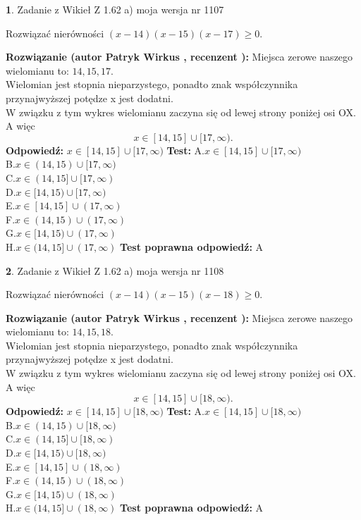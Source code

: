 \documentclass[12pt, a4paper]{article}
\theoremstyle{definition} %
\newtheorem{zad}{}
\newcommand{\zadStart}[1]{\begin{zad}#1\newline}
\newcommand{\zadStop}{\end{zad}}
\newcommand{\rozwStart}[2]{\noindent \textbf{Rozwiązanie (autor #1 , recenzent #2): }\newline}
\newcommand{\rozwStop}{\newline}
\newcommand{\odpStart}{\noindent \textbf{Odpowiedź:}\newline}
\newcommand{\odpStop}{\newline}
\newcommand{\testStart}{\noindent \textbf{Test:}\newline}
\newcommand{\testStop}{\newline}
\newcommand{\kluczStart}{\noindent \textbf{Test poprawna odpowiedź:}\newline}
\newcommand{\kluczStop}{\newline}
\begin{document}
\zadStart{Zadanie z Wikieł Z 1.62 a) moja wersja nr 1107}

Rozwiązać nierówności $(x-14)(x-15)(x-17)\ge0$.
\zadStop
\rozwStart{Patryk Wirkus}{}
Miejsca zerowe naszego wielomianu to: $14, 15, 17$.\\
Wielomian jest stopnia nieparzystego, ponadto znak współczynnika przy\linebreak najwyższej potędze x jest dodatni.\\ W związku z tym wykres wielomianu zaczyna się od lewej strony poniżej osi OX. A więc $$x \in [14,15] \cup [17,\infty).$$
\rozwStop
\odpStart
$x \in [14,15] \cup [17,\infty)$
\odpStop
\testStart
A.$x \in [14,15] \cup [17,\infty)$\\
B.$x \in (14,15) \cup [17,\infty)$\\
C.$x \in (14,15] \cup [17,\infty)$\\
D.$x \in [14,15) \cup [17,\infty)$\\
E.$x \in [14,15] \cup (17,\infty)$\\
F.$x \in (14,15) \cup (17,\infty)$\\
G.$x \in [14,15) \cup (17,\infty)$\\
H.$x \in (14,15] \cup (17,\infty)$
\testStop
\kluczStart
A
\kluczStop



\zadStart{Zadanie z Wikieł Z 1.62 a) moja wersja nr 1108}

Rozwiązać nierówności $(x-14)(x-15)(x-18)\ge0$.
\zadStop
\rozwStart{Patryk Wirkus}{}
Miejsca zerowe naszego wielomianu to: $14, 15, 18$.\\
Wielomian jest stopnia nieparzystego, ponadto znak współczynnika przy\linebreak najwyższej potędze x jest dodatni.\\ W związku z tym wykres wielomianu zaczyna się od lewej strony poniżej osi OX. A więc $$x \in [14,15] \cup [18,\infty).$$
\rozwStop
\odpStart
$x \in [14,15] \cup [18,\infty)$
\odpStop
\testStart
A.$x \in [14,15] \cup [18,\infty)$\\
B.$x \in (14,15) \cup [18,\infty)$\\
C.$x \in (14,15] \cup [18,\infty)$\\
D.$x \in [14,15) \cup [18,\infty)$\\
E.$x \in [14,15] \cup (18,\infty)$\\
F.$x \in (14,15) \cup (18,\infty)$\\
G.$x \in [14,15) \cup (18,\infty)$\\
H.$x \in (14,15] \cup (18,\infty)$
\testStop
\kluczStart
A
\kluczStop
\end{document}
